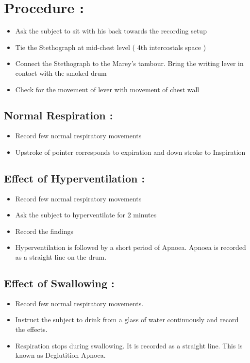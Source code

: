 \documentclass[a4paper,12pt,openany,oneside]{book}
\begin{document}
\section*{Procedure :}
\begin{itemize}
\item{Ask the subject to sit with his back towards the recording setup}
\item{Tie the Stethograph at mid-chest level ( 4th intercostals space )}
\item{Connect the Stethograph to the Marey’s tambour. Bring the writing lever in contact with the smoked drum}
\item{Check for the movement of lever with movement of chest wall}
\end{itemize}
\subsection*{Normal Respiration :}
\begin{itemize}
\item{Record few normal respiratory movements}
\item{Upstroke of pointer corresponds to expiration and down stroke to Inspiration}
\end{itemize}
\subsection*{Effect of Hyperventilation :}
\begin{itemize}
\item{Record few normal respiratory movements}
\item{Ask the subject to hyperventilate for 2 minutes}
\item{Record the findings}
\item{Hyperventilation is followed by a short period of Apnoea. Apnoea is recorded as a straight line on the drum.}
\end{itemize}
\subsection*{Effect of Swallowing :}
\begin{itemize}
\item{Record few normal respiratory movements.}
\item{Instruct the subject to drink from a glass of water continuously and record the effects.}
\item{Respiration stops during swallowing. It is recorded as a straight line. This is known as Deglutition Apnoea.}
\end{itemize}
\end{document}
